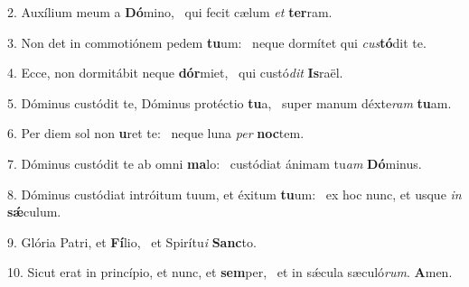 2. Auxílium meum a \textbf{Dó}mino, \ast\  qui fecit cælum \textit{et} \textbf{ter}ram.\

3. Non det in commotiónem pedem \textbf{tu}um: \ast\  neque dormítet qui \textit{cus}\textbf{tó}dit te.\

4. Ecce, non dormitábit neque \textbf{dór}miet, \ast\  qui custó\textit{dit} \textbf{Is}raël.\

5. Dóminus custódit te, Dóminus protéctio \textbf{tu}a, \ast\  super manum déxte\textit{ram} \textbf{tu}am.\

6. Per diem sol non \textbf{u}ret te: \ast\  neque luna \textit{per} \textbf{noc}tem.\

7. Dóminus custódit te ab omni \textbf{ma}lo: \ast\  custódiat ánimam tu\textit{am} \textbf{Dó}minus.\

8. Dóminus custódiat intróitum tuum, et éxitum \textbf{tu}um: \ast\  ex hoc nunc, et usque \textit{in} \textbf{sǽ}culum.\

9. Glória Patri, et \textbf{Fí}lio, \ast\  et Spirítu\textit{i} \textbf{Sanc}to.\

10. Sicut erat in princípio, et nunc, et \textbf{sem}per, \ast\  et in sǽcula sæculó\textit{rum}. \textbf{A}men.\


